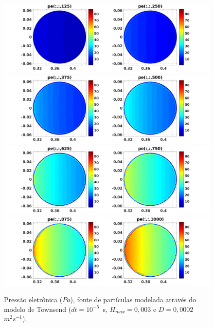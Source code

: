 \documentclass[12pt,oneside,a4paper]{abntex2}
\begin{document}
\begin{figure}[H]
\centering
\includegraphics[scale=0.5]{../SImulacao_breakdown/PDE/petod1B2.png}  
\includegraphics[scale=0.5]{../SImulacao_breakdown/PDE/petod2B2.png} 
\includegraphics[scale=0.5]{../SImulacao_breakdown/PDE/petod3B2.png} 
\includegraphics[scale=0.5]{../SImulacao_breakdown/PDE/petod4B2.png} 
\caption{Pressão eletrônica ($Pa$), fonte de partículas modelada através do modelo de Townsend ($dt=10^{-5}$\ s, $H_{max} = 0,003$ e $D=0,0002$\ $m^2s^{-1}$).}
\label{resucoef3}
\end{figure}
\end{document}
